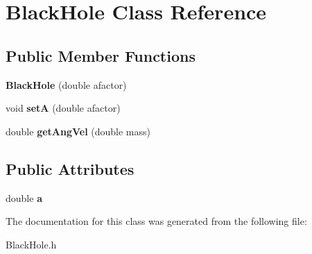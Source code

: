 \hypertarget{class_black_hole}{}\section{Black\+Hole Class Reference}
\label{class_black_hole}
\subsection*{Public Member Functions}
\begin{DoxyCompactItemize}
\item 
\mbox{\label{class_black_hole_a3f4765d65b67bccc558898cd1d22eedd}} 
{\bfseries Black\+Hole} (double afactor)
\item 
\mbox{\label{class_black_hole_ae518f35d2ce312345270bfdabb98884d}} 
void {\bfseries setA} (double afactor)
\item 
\mbox{\label{class_black_hole_ad77f192e3025ad0bb8eabad995b987f8}} 
double {\bfseries get\+Ang\+Vel} (double mass)
\end{DoxyCompactItemize}
\subsection*{Public Attributes}
\begin{DoxyCompactItemize}
\item 
\mbox{\label{class_black_hole_a6ac8347e8e7b6cfe4c485114a4fa4625}} 
double {\bfseries a}
\end{DoxyCompactItemize}


The documentation for this class was generated from the following file\+:\begin{DoxyCompactItemize}
\item 
Black\+Hole.\+h\end{DoxyCompactItemize}

